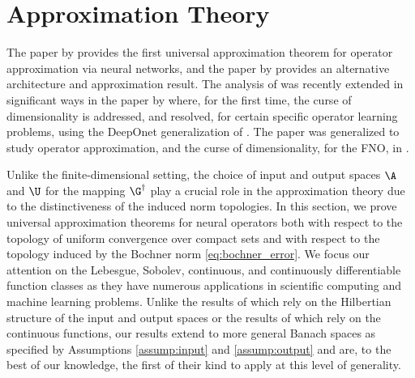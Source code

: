 
\section{Approximation Theory}
\label{sec:approximation}

The paper by \cite{chen1995universal} provides the first universal approximation theorem
for operator approximation via neural networks, and the paper by
\cite{Kovachki} provides an alternative architecture and approximation result.
The analysis of \cite{chen1995universal} was recently extended
in significant ways in the paper by \cite{lanthaler2021error} where, for the first
time, the curse of dimensionality is addressed, and resolved, for certain specific
operator learning problems, using the DeepOnet generalization
\cite{lu2019deeponet,lu2021learning} of \cite{chen1995universal}.
The paper \cite{lanthaler2021error} was generalized to study
operator approximation, and the curse of dimensionality, for the FNO,
in \cite{kovachki2021universal}.


Unlike the finite-dimensional setting, the choice of input 
and output spaces \(\A\) and \(\U\) for the mapping \(\G^\dagger\) play a crucial role in the approximation theory due to the distinctiveness of the induced norm topologies.
In this section, we prove universal approximation theorems for neural operators both 
with respect to the topology of uniform convergence over compact sets and 
with respect to the topology induced by
the Bochner norm \eqref{eq:bochner_error}.  We focus our attention on the Lebesgue, Sobolev, continuous, and continuously differentiable function classes as they have numerous applications in scientific computing and machine learning problems. Unlike the results of \cite{Kovachki, kovachki2021universal} which rely on the Hilbertian %
structure of the input and output spaces or the results of \cite{chen1995universal, lanthaler2021error} which rely on the continuous  functions, our results extend to more general Banach spaces as specified by Assumptions \ref{assump:input} and \ref{assump:output}  and are, to the best of our knowledge, the first of their kind
to apply at this level of generality.

